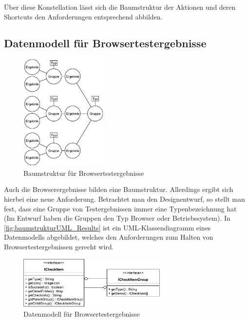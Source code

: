 Über diese Konstellation lässt sich die Baumstruktur der Aktionen und deren Shortcuts den Anforderungen entsprechend abbilden.

\newpage

\subsection{Datenmodell für Browsertestergebnisse}
\label{DatenmodellBrow}

\begin{figure}
	\includegraphics[width=165px]{../graphic/diagrams/Baumstruktur_Results/Baumstruktur}
	\caption{Baumstruktur für Browsertestergebnisse}
	\label{fig:baumstruktur_Result}
\end{figure}

Auch die Browserergebnisse bilden eine Baumstruktur. Allerdings ergibt sich hierbei eine neue Anforderung. Betrachtet man den Designentwurf, so stellt man fest, dass eine Gruppe von Testergebnissen immer eine Typenbezeichnung hat (Im Entwurf haben die Gruppen den Typ \glqq Browser\grqq\xspace oder \glqq Betriebssystem\grqq). In \autoref{fig:baumstrukturUML_Results} ist ein UML-Klassendiagramm eines Datenmodells abgebildet, welches den Anforderungen zum Halten von Browsertestergebnissen gerecht wird.

\begin{figure}[H]
	\flushright
	\includegraphics[width=280px]{../graphic/diagrams/CD_Baumstruktur_Results/Baumstruktur}
	\captionsetup{width=235px, justification=raggedleft}
	\caption{Datenmodell für Browsertestergebnisse}
	\label{fig:baumstrukturUML_Results}
\end{figure}

